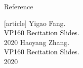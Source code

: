 \documentclass{beamer}
\begin{document}
\begin{frame}{Reference}
  \begin{thebibliography}{9}
  [article]
   Yigao Fang.\\
  \textcolor{black}{VP160 Recitation Slides.}\\
  2020
   Haoyang Zhang.\\
  \textcolor{black}{VP160 Recitation Slides.}\\
  2020
  \end{thebibliography}
  \end{frame}

  
\end{document}
